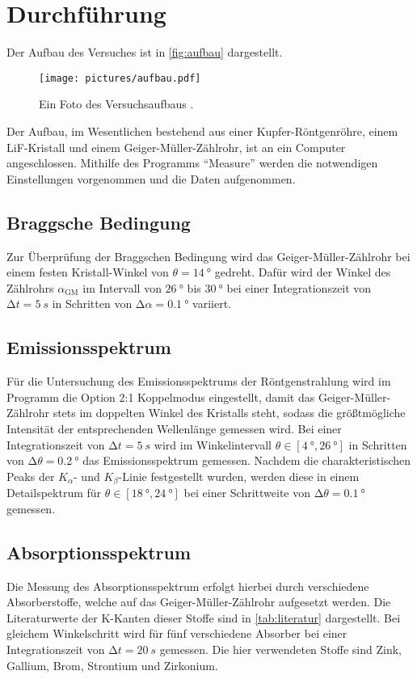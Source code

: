\section{Durchführung}
\label{sec:Durchführung}

Der Aufbau des Versuches ist in \autoref{fig:aufbau} dargestellt.
\begin{figure}
    \centering
    \texttt{[image: pictures/aufbau.pdf]}
    \caption{Ein Foto des Versuchsaufbaus \cite{v602}.}
    \label{fig:aufbau}
\end{figure}
Der Aufbau, im Wesentlichen bestehend aus einer Kupfer-Röntgenröhre, 
einem LiF-Kristall und einem Geiger-Müller-Zählrohr, ist an ein Computer angeschlossen.
Mithilfe des Programms \enquote{Measure} werden die notwendigen Einstellungen vorgenommen
und die Daten aufgenommen.


\subsection{Braggsche Bedingung}

Zur Überprüfung der Braggschen Bedingung wird das Geiger-Müller-Zählrohr
bei einem festen Kristall-Winkel von $\theta = \qty{14}{°}$ gedreht.
Dafür wird der Winkel des Zählrohrs $\alpha_\text{GM}$ im Intervall von $\qty{26}{°}$ bis $\qty{30}{°}$ bei einer Integrationszeit von 
$\increment t = \qty{5}{s}$ in Schritten von $\increment \alpha = \qty{0.1}{°}$ variiert. 


\subsection{Emissionsspektrum}

Für die Untersuchung des Emissionsspektrums der Röntgenstrahlung wird im Programm
die Option 2:1 Koppelmodus eingestellt, 
damit das Geiger-Müller-Zählrohr stets im doppelten Winkel des Kristalls steht,
sodass die größtmögliche Intensität der entsprechenden Wellenlänge gemessen wird.
Bei einer Integrationszeit von $\increment t = \qty{5}{s}$ wird im Winkelintervall 
$\theta \in [\qty{4}{°}, \qty{26}{°}]$ in Schritten von $\increment \theta = \qty{0.2}{°}$
das Emissionsspektrum gemessen.
Nachdem die charakteristischen Peaks der $K_\alpha$- und $K_\beta$-Linie festgestellt wurden,
werden diese in einem Detailspektrum für $\theta \in [\qty{18}{°}, \qty{24}{°}]$ bei einer Schrittweite von $\increment \theta = \qty{0.1}{°}$ gemessen.


\subsection{Absorptionsspektrum}

Die Messung des Absorptionsspektrum erfolgt hierbei durch verschiedene Absorberstoffe, 
welche auf das Geiger-Müller-Zählrohr aufgesetzt werden.
Die Literaturwerte der K-Kanten dieser Stoffe sind in \autoref{tab:literatur} dargestellt.
Bei gleichem Winkelschritt wird für fünf verschiedene Absorber bei einer Integrationszeit von $\increment t = \qty{20}{s}$ gemessen.
Die hier verwendeten Stoffe sind Zink, Gallium, Brom, Strontium und Zirkonium.